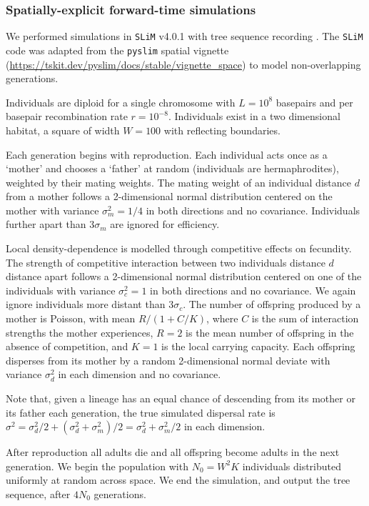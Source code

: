 \documentclass[12pt]{article}
\begin{document}
\subsubsection*{Spatially-explicit forward-time simulations}

We performed simulations in \texttt{SLiM} v4.0.1 \citep{haller2023slim} with tree sequence recording \citep{haller2019tree}.
The \texttt{SLiM} code was adapted from the \texttt{pyslim} spatial vignette (\url{https://tskit.dev/pyslim/docs/stable/vignette_space}) to model non-overlapping generations. 

Individuals are diploid for a single chromosome with $L=10^8$ basepairs and per basepair recombination rate $r=10^{-8}$.
Individuals exist in a two dimensional habitat, a square of width $W=100$ with reflecting boundaries.

Each generation begins with reproduction.
Each individual acts once as a `mother' and chooses a `father' at random (individuals are hermaphrodites), weighted by their mating weights.
The mating weight of an individual distance $d$ from a mother follows a 2-dimensional normal distribution centered on the mother with variance $\sigma_m^2=1/4$ in both directions and no covariance.
Individuals further apart than $3\sigma_m$ are ignored for efficiency.

Local density-dependence is modelled through competitive effects on fecundity.
The strength of competitive interaction between two individuals distance $d$ distance apart follows a 2-dimensional normal distribution centered on one of the individuals with variance $\sigma_c^2=1$ in both directions and no covariance.
We again ignore individuals more distant than $3\sigma_c$.
The number of offspring produced by a mother is Poisson, with mean $R/(1 + C/K)$, where $C$ is the sum of interaction strengths the mother experiences, $R=2$ is the mean number of offspring in the absence of competition, and $K=1$ is the local carrying capacity. 
Each offspring disperses from its mother by a random 2-dimensional normal deviate with variance $\sigma_d^2$ in each dimension and no covariance. 

Note that, given a lineage has an equal chance of descending from its mother or its father each generation, the true simulated dispersal rate is $\sigma^2 = \sigma_d^2/2 + (\sigma_d^2 + \sigma_m^2)/2 = \sigma_d^2 + \sigma_m^2/2$ \citep{smith2023dispersal} in each dimension.

After reproduction all adults die and all offspring become adults in the next generation.
We begin the population with $N_0=W^2 K$ individuals distributed uniformly at random across space.
We end the simulation, and output the tree sequence, after $4N_0$ generations.
\end{document}
